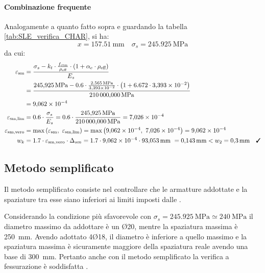  \paragraph{Combinazione frequente}
 Analogamente a quanto fatto sopra e guardando la tabella \ref{tab:SLE_verifica_CHAR}, si ha:
\[
    x = \SI{157.51}{\milli\metre} \quad \sigma_{s} = \SI{245.925}{\mega\pascal}
\] 
da cui:
\[
\begin{split}
    \varepsilon_\textup{sm} 
    &= \frac{ \sigma_{s} - k_{t} \cdot \frac{ f_\textup{ctm} }{ \rho_\textup{eff} } \cdot \left( 1 + \alpha_{e} \cdot \rho_\textup{eff} \right) }{ E_{s} }  \\
    &= \frac{ \SI{245.925}{\mega\pascal} - 0.6 \cdot \frac{ \SI{2.565}{\mega\pascal} }{\num{3.393e-2 } } \cdot \left( 1 + 6.672 \cdot\num{3.393e-2 } \right) }{ \SI{210000.000}{\mega\pascal} } \\
    &=\num{9.062e-4 }  \\
    \varepsilon_\textup{sm,lim} 
    &= 0.6 \cdot \frac{ \sigma_{s} }{ E_{s} }  
    = 0.6 \cdot \frac{ \SI{245.925}{\mega\pascal} }{ \SI{210000.000}{\mega\pascal} } 
    =\num{7.026e-4 }  \\
    \varepsilon_\textup{sm,vero} 
    &= \max { \left( \varepsilon_\textup{sm} ,\  \varepsilon_\textup{sm,lim} \right) }  
    = \max { \left(\num{9.062e-4 } ,\ \num{7.026e-4 } \right) } 
    =\num{9.062e-4 }  \\
    w_{k} 
    &= 1.7 \cdot \varepsilon_\textup{sm,vero} \cdot \Delta_{sm}  
    =  1.7 \cdot\num{9.062e-4 } \cdot \SI{93.053}{\milli\metre} \ 
    = \SI{0.143}{\milli\metre}  < w_2 = \SI{0.3}{\milli\metre} \quad \checked\\
\end{split}
\]
\subsection{Metodo semplificato}
Il metodo semplificato consiste nel controllare che le armatture addottate e la spaziature tra esse siano inferiori ai limiti imposti dalle .

Considerando la condizione più sfavorevole con $\sigma_{s} = \SI{245.925}{\mega\pascal} \simeq \SI{240}{\mega\pascal}$ il diametro massimo da addottare è un Ø20, mentre la spaziatura massima è \SI{250}{\milli\metre}. 
Avendo adottato 4Ø18, il diametro è inferiore a quello massimo e la spaziatura massima è sicuramente maggiore della spaziatura reale avendo una base di \SI{300}{\milli\metre}. 
Pertanto anche con il metodo semplificato la verifica a fessurazione è soddisfatta \checked.


